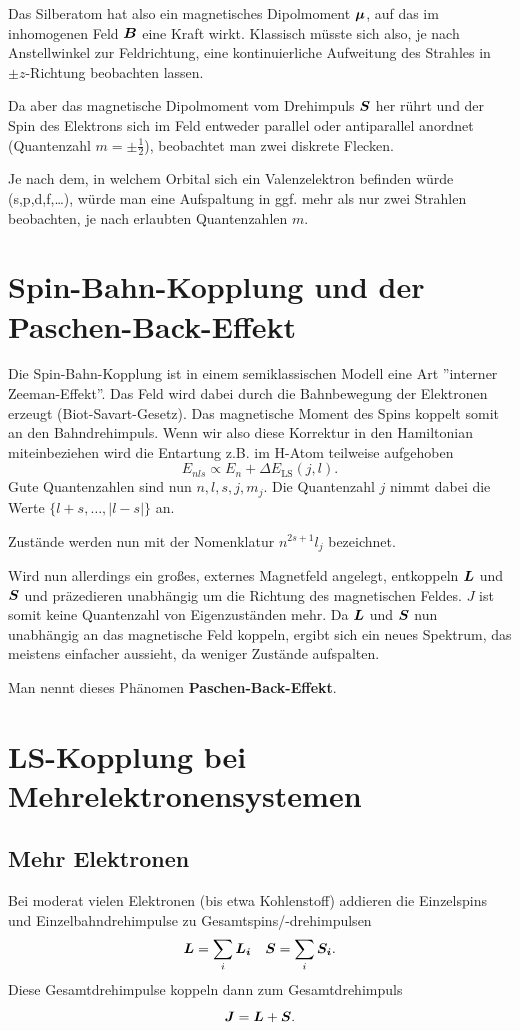 Das Silberatom hat also ein magnetisches Dipolmoment $\boldsymbol{\mu}$, auf das im inhomogenen Feld $\boldsymbol{B}$ eine Kraft wirkt.
Klassisch müsste sich also, je nach Anstellwinkel zur Feldrichtung, eine kontinuierliche Aufweitung des Strahles in $\pm z$-Richtung beobachten lassen.

Da aber das magnetische Dipolmoment vom Drehimpuls $\boldsymbol{S}$ her rührt und der Spin des Elektrons sich im Feld entweder parallel oder antiparallel anordnet (Quantenzahl $m=\pm\frac{1}{2}$), beobachtet man zwei diskrete Flecken.

Je nach dem, in welchem Orbital sich ein Valenzelektron befinden würde (s,p,d,f,\dots), würde man eine Aufspaltung in ggf. mehr als nur zwei Strahlen beobachten, je nach erlaubten Quantenzahlen $m$.

\section{Spin-Bahn-Kopplung und der Paschen-Back-Effekt}
Die Spin-Bahn-Kopplung ist in einem semiklassischen Modell eine Art ''interner Zeeman-Effekt''.
Das Feld wird dabei durch die Bahnbewegung der Elektronen erzeugt (Biot-Savart-Gesetz).
Das magnetische Moment des Spins koppelt somit an den Bahndrehimpuls.
Wenn wir also diese Korrektur in den Hamiltonian miteinbeziehen wird die Entartung z.B. im H-Atom teilweise aufgehoben
\begin{equation*}
	E_{nls} \propto E_n + \Delta E_\text{LS}(j,l).
\end{equation*}
Gute Quantenzahlen sind nun $n, l, s, j, m_j$.
Die Quantenzahl $j$ nimmt dabei die Werte $\{l+s,\dots,|l-s|\}$ an.

Zustände werden nun mit der Nomenklatur $n^{2s+1}l_j$ bezeichnet.

Wird nun allerdings ein großes, externes Magnetfeld angelegt, entkoppeln $\boldsymbol{L}$ und $\boldsymbol{S}$ und präzedieren unabhängig um die Richtung des magnetischen Feldes.
$J$ ist somit keine Quantenzahl von Eigenzuständen mehr.
Da $\boldsymbol{L}$ und $\boldsymbol{S}$ nun unabhängig an das magnetische Feld koppeln, ergibt sich ein neues Spektrum, das meistens einfacher aussieht, da weniger Zustände aufspalten.

Man nennt dieses Phänomen \textbf{Paschen-Back-Effekt}.

\section{LS-Kopplung bei Mehrelektronensystemen}
\subsection{Mehr Elektronen}
Bei moderat vielen Elektronen (bis etwa Kohlenstoff) addieren die Einzelspins und Einzelbahndrehimpulse zu Gesamtspins/-drehimpulsen
\begin{equation*}
	\boldsymbol{L} = \sum_i\boldsymbol{L_i}\quad\boldsymbol{S} = \sum_i\boldsymbol{S_i}.
\end{equation*}
Diese Gesamtdrehimpulse koppeln dann zum Gesamtdrehimpuls
\begin{equation*}
	\boldsymbol{J} = \boldsymbol{L} + \boldsymbol{S}.
\end{equation*}

